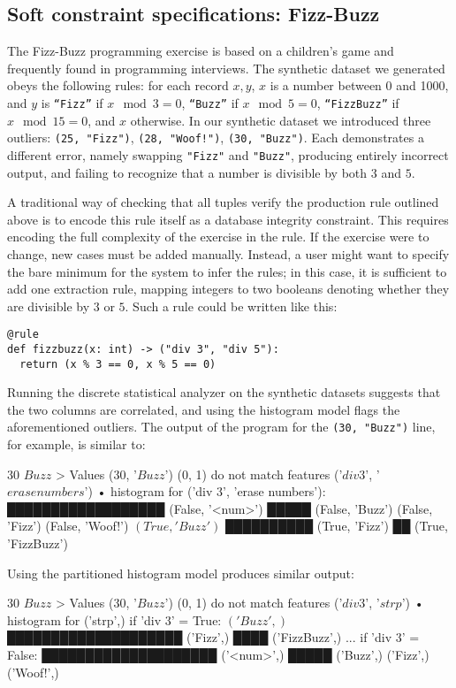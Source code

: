 \subsection{Soft constraint specifications: Fizz-Buzz}
The Fizz-Buzz programming exercise is based on a children's game and frequently found in programming interviews. The synthetic dataset we generated obeys the following rules: for each record \(x, y\), $x$ is a number between 0 and 1000, and $y$ is \texttt{``Fizz''} if \(x \mod 3 = 0\), \texttt{``Buzz''} if \(x \mod 5 = 0\), \texttt{``FizzBuzz''} if \(x \mod 15 = 0\), and \(x\) otherwise. In our synthetic dataset we introduced three outliers: \texttt{(25, "Fizz")}, \texttt{(28, "Woof!")}, \texttt{(30, "Buzz")}. Each demonstrates a different error, namely swapping \texttt{"Fizz"} and \texttt{"Buzz"}, producing entirely incorrect output, and failing to recognize that a number is divisible by both $3$ and $5$.

A traditional way of checking that all tuples verify the production rule outlined above is to encode this rule itself as a database integrity constraint. This requires encoding the full complexity of the exercise in the rule. If the exercise were to change, new cases must be added manually. Instead, a user might want to specify the bare minimum for the system to infer the rules; in this case, it is sufficient to add one extraction rule, mapping integers to two booleans denoting whether they are divisible by $3$ or $5$. Such a rule could be written like this:

\begin{verbatim}
@rule
def fizzbuzz(x: int) -> ("div 3", "div 5"):
  return (x % 3 == 0, x % 5 == 0)
\end{verbatim}

Running the discrete statistical analyzer on the synthetic datasets suggests that the two columns are correlated, and using the histogram model flags the aforementioned outliers. The output of the program for the \texttt{(30, "Buzz")} line, for example, is similar to:

\begin{lstnobreak}[gobble=2]
   $30$ $Buzz$
   > Values ($30$, '$Buzz$') (0, 1) do not match
     features ('$div 3$', '$erase numbers$')
     • histogram for ('div 3', 'erase numbers'):
       ██████████████████ (False, '<num>')
       █████ (False, 'Buzz')
       (False, 'Fizz')
       (False, 'Woof!')
       $(True, 'Buzz')$
       ██████████ (True, 'Fizz')
       ██ (True, 'FizzBuzz')
\end{lstnobreak}

Using the partitioned histogram model produces similar output:

\begin{lstnobreak}[gobble=2]
   $30$ $Buzz$
   > Values ($30$, '$Buzz$') (0, 1) do not match
     features ('$div 3$', '$strp$')
     • histogram for ('strp',) if 'div 3' = True:
       $('Buzz',)$
       ████████████████████ ('Fizz',)
       ████ ('FizzBuzz',)
     ... if 'div 3' = False:
       ████████████████████ ('<num>',)
       █████ ('Buzz',)
       ('Fizz',)
       ('Woof!',)
\end{lstnobreak}
